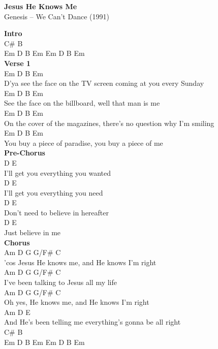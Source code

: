 \documentclass[a4paper]{article}
\begin{document}
    \begin{center}
        \textbf{Jesus He Knows Me}
        ~\\
        Genesis -- We Can't Dance (1991)
    \end{center}
    {
        \scriptsize
        \textbf{Intro}
        ~\\
        {
            \cutive
            \obeyspaces
C\# B
\\
Em  D  B  Em  Em  D  B  Em
\\

        }
        \textbf{Verse 1}
        ~\\
        {
            \cutive
            \obeyspaces
Em                       D         B             Em
\\
D'ya see the face on the TV screen coming at you every Sunday
\\
Em                  D          B                Em
\\
See the face on the billboard, well that man is me
\\
Em                  D          B                   Em
\\
On the cover of the magazines, there's no question why I'm smiling
\\
Em                 D         B                  Em
\\
You buy a piece of paradise, you buy a piece of me
\\

        }
        \textbf{Pre-Chorus}
        ~\\
        {
            \cutive
            \obeyspaces
D            E
\\
I'll get you everything you wanted
\\
D            E
\\
I'll get you everything you need
\\
D                E
\\
Don't need to believe in hereafter
\\
D               E
\\
Just believe in me
\\

        }
        \textbf{Chorus}
        ~\\
        {
            \cutive
            \obeyspaces
Am            D                G     G/F\# C
\\
'cos Jesus He knows me, and He knows I'm  right
\\
Am                   D     G   G/F\# C
\\
I've been talking to Jesus all my   life
\\
Am         D                G     G/F\# C
\\
Oh yes, He knows me, and He knows I'm  right
\\
Am            D               E
\\
And He's been telling me everything's gonna be all right
\\
C\# B
\\
Em  D  B  Em  Em  D  B  Em
\\

}}
\end{document}

